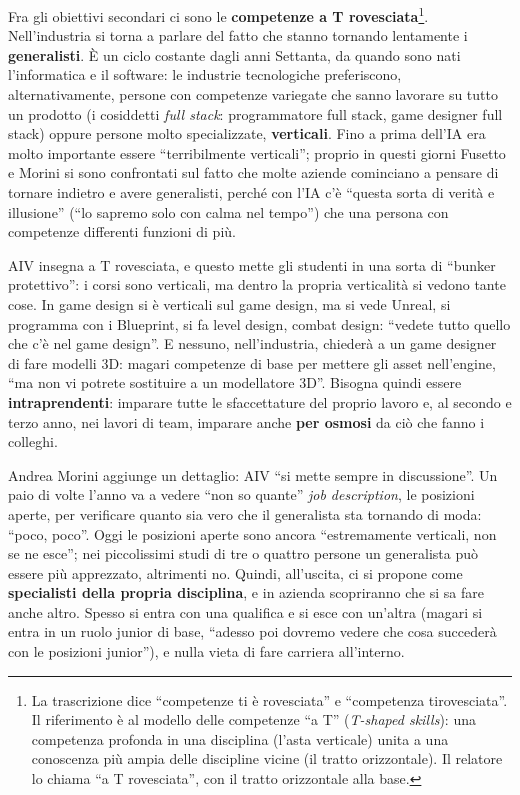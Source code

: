 Fra gli obiettivi secondari ci sono le \textbf{competenze a T
rovesciata}\footnote{La trascrizione dice ``competenze ti è rovesciata'' e
``competenza tirovesciata''. Il riferimento è al modello delle competenze
``a T'' (\emph{T-shaped skills}): una competenza profonda in una
disciplina (l'asta verticale) unita a una conoscenza più ampia delle
discipline vicine (il tratto orizzontale). Il relatore lo chiama ``a T
rovesciata'', con il tratto orizzontale alla base.}. Nell'industria si torna
a parlare del fatto che stanno tornando lentamente i \textbf{generalisti}.
È un ciclo costante dagli anni Settanta, da quando sono nati l'informatica e
il software: le industrie tecnologiche preferiscono, alternativamente,
persone con competenze variegate che sanno lavorare su tutto un prodotto (i
cosiddetti \emph{full stack}: programmatore full stack, game designer full
stack) oppure persone molto specializzate, \textbf{verticali}. Fino a prima
dell'IA era molto importante essere ``terribilmente verticali''; proprio in
questi giorni Fusetto e Morini si sono confrontati sul fatto che molte
aziende cominciano a pensare di tornare indietro e avere generalisti,
perché con l'IA c'è ``questa sorta di verità e illusione'' (``lo sapremo
solo con calma nel tempo'') che una persona con competenze differenti
funzioni di più.

AIV insegna a T rovesciata, e questo mette gli studenti in una sorta di
``bunker protettivo'': i corsi sono verticali, ma dentro la propria
verticalità si vedono tante cose. In game design si è verticali sul game
design, ma si vede Unreal, si programma con i Blueprint, si fa level design,
combat design: ``vedete tutto quello che c'è nel game design''. E nessuno,
nell'industria, chiederà a un game designer di fare modelli 3D: magari
competenze di base per mettere gli asset nell'engine, ``ma non vi potrete
sostituire a un modellatore 3D''. Bisogna quindi essere
\textbf{intraprendenti}: imparare tutte le sfaccettature del proprio lavoro
e, al secondo e terzo anno, nei lavori di team, imparare anche \textbf{per
osmosi} da ciò che fanno i colleghi.

Andrea Morini aggiunge un dettaglio: AIV ``si mette sempre in discussione''.
Un paio di volte l'anno va a vedere ``non so quante'' \emph{job
description}, le posizioni aperte, per verificare quanto sia vero che il
generalista sta tornando di moda: ``poco, poco''. Oggi le posizioni aperte
sono ancora ``estremamente verticali, non se ne esce''; nei piccolissimi
studi di tre o quattro persone un generalista può essere più apprezzato,
altrimenti no. Quindi, all'uscita, ci si propone come \textbf{specialisti
della propria disciplina}, e in azienda scopriranno che si sa fare anche
altro. Spesso si entra con una qualifica e si esce con un'altra (magari si
entra in un ruolo junior di base, ``adesso poi dovremo vedere che cosa
succederà con le posizioni junior''), e nulla vieta di fare carriera
all'interno.

